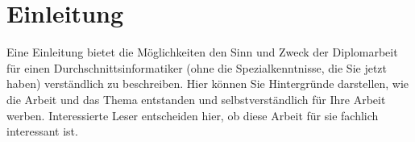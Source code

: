 
\chapter{Einleitung} %

\label{ch:einleitung} %


Eine Einleitung bietet die Möglichkeiten den Sinn und Zweck der Diplomarbeit
für einen Durchschnittsinformatiker (ohne die Spezialkenntnisse, die Sie jetzt
haben) verständlich zu beschreiben. Hier können Sie Hintergründe darstellen,
wie die Arbeit und das Thema entstanden und selbstverständlich für Ihre Arbeit
werben. Interessierte Leser entscheiden hier, ob diese Arbeit für sie fachlich
interessant ist.
